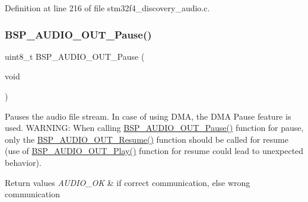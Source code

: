 Definition at line 216 of file stm32f4\+\_\+discovery\+\_\+audio.\+c.

\mbox{\label{group___s_t_m32_f4___d_i_s_c_o_v_e_r_y___a_u_d_i_o___o_u_t___private___functions_ga73a0f92b8adbfb2e8207067434c2bfef}} 
\subsubsection{\texorpdfstring{B\+S\+P\+\_\+\+A\+U\+D\+I\+O\+\_\+\+O\+U\+T\+\_\+\+Pause()}{BSP\_AUDIO\_OUT\_Pause()}}
{\footnotesize\ttfamily uint8\+\_\+t B\+S\+P\+\_\+\+A\+U\+D\+I\+O\+\_\+\+O\+U\+T\+\_\+\+Pause (\begin{DoxyParamCaption}\item[{void}]{ }\end{DoxyParamCaption})}



Pauses the audio file stream. In case of using D\+MA, the D\+MA Pause feature is used. W\+A\+R\+N\+I\+NG\+: When calling \mbox{\hyperlink{group___s_t_m32_f4___d_i_s_c_o_v_e_r_y___a_u_d_i_o___o_u_t___private___functions_ga73a0f92b8adbfb2e8207067434c2bfef}{B\+S\+P\+\_\+\+A\+U\+D\+I\+O\+\_\+\+O\+U\+T\+\_\+\+Pause()}} function for pause, only the \mbox{\hyperlink{group___s_t_m32_f4___d_i_s_c_o_v_e_r_y___a_u_d_i_o___o_u_t___private___functions_ga064f0eddd4ab25a33fd1fe83af429c9f}{B\+S\+P\+\_\+\+A\+U\+D\+I\+O\+\_\+\+O\+U\+T\+\_\+\+Resume()}} function should be called for resume (use of \mbox{\hyperlink{group___s_t_m32_f4___d_i_s_c_o_v_e_r_y___a_u_d_i_o___o_u_t___private___functions_gaa415fdd481a01468fdfcd9d91f0f6711}{B\+S\+P\+\_\+\+A\+U\+D\+I\+O\+\_\+\+O\+U\+T\+\_\+\+Play()}} function for resume could lead to unexpected behavior). 


\begin{DoxyRetVals}{Return values}
{\em A\+U\+D\+I\+O\+\_\+\+OK} & if correct communication, else wrong communication \\
\hline
\end{DoxyRetVals}


